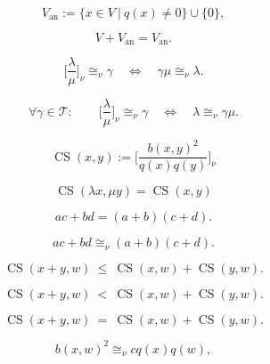 \documentclass{article}
\begin{document}
\begin{equation}\label{eq:II.6.1}
V_{\operatorname{an}}:=\{x\in V {\ {|} \ }q(x)\ne0\} \cup \{ 0 \},\end{equation}

\begin{equation}\label{eq:II.6.2}
V+V_{\operatorname{an}} =V_{\operatorname{an}}.\end{equation}

\begin{equation}\label{eq:II.6.3}
\bigg[\frac{\lambda}{\mu}\bigg]_\nu\cong_\nu\gamma
{\quad {\Leftrightarrow} \quad }\gamma\mu\cong_\nu{\lambda}.
\end{equation}

\begin{equation}\label{eq:II.6.4} \forall {\gamma} \in {\mathcal T}: \qquad
\bigg[\frac{\lambda}{\mu}\bigg]_\nu\cong_\nu\gamma {\quad {\Leftrightarrow} \quad }{\lambda}\cong_\nu\gamma\mu.
\end{equation}

$${\operatorname{CS}}(x,y):=\bigg[\frac{b(x,y)^2}{q(x)q(y)}\bigg]_\nu$$

\begin{equation}\label{eq:II.6.6}
{\operatorname{CS}}({\lambda} x,\mu y)={\operatorname{CS}}(x,y)\end{equation}

\begin{equation}\label{eq:II.6.8}
ac+bd=(a+b)(c+d).\end{equation}

\begin{equation}\label{eq:II.6.9}
ac+bd\cong_\nu (a+b)(c+d).\end{equation}

\begin{equation}\label{eq:II.6.10}
{\operatorname{CS}}(x+y,w){\ {\le} \ }{\operatorname{CS}}(x,w)+{\operatorname{CS}}(y,w).\end{equation}

\begin{equation}\label{eq:II.6.11}
{\operatorname{CS}}(x+y,w){\ {<} \ }{\operatorname{CS}}(x,w)+{\operatorname{CS}}(y,w).\end{equation}

\begin{equation}\label{eq:II.6.12}
{\operatorname{CS}}(x+y,w){\ {=} \ }{\operatorname{CS}}(x,w)+{\operatorname{CS}}(y,w).\end{equation}

$$b(x,w)^2\cong_\nu cq(x)q(w),$$
\end{document}
